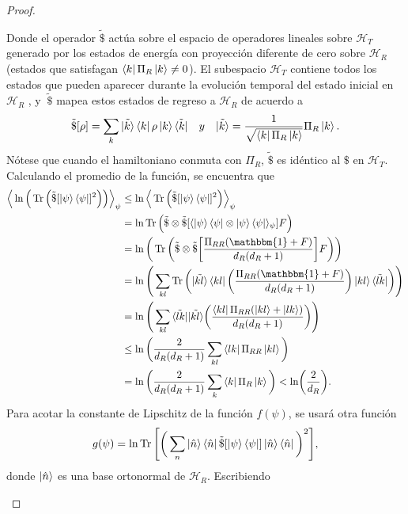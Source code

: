 \begin{proof}
\begin{enumerate}
Donde el operador  $ \tilde{\$} $ actúa sobre el espacio de operadores lineales sobre  $\mathcal{H}_{T}$ generado por los estados de energía con proyección diferente de cero sobre $\mathcal{H}_{R}$ (estados que satisfagan $\bra{k} \Pi_{R} \ket{k} \neq 0$). El subespacio $\mathcal{H}_{T}$ contiene todos los estados que pueden aparecer durante la evolución temporal del estado inicial en $\mathcal{H}_{R}$ , y $\ \widetilde{\$} $ mapea estos estados de regreso a $\mathcal{H}_{R}$ de acuerdo a 
\begin{equation}
 \tilde{\$}[\rho]= \sum_{k}  \tilde{\ket{k}} \bra{k} \rho \ket{k} \tilde{\bra{k}} \quad y \quad  \tilde{\ket{k}}= \frac{1}{\sqrt{\bra{k}\Pi_{R}\ket{k}}} \Pi_{R} \ket{k}.
\end{equation}
Nótese que cuando el hamiltoniano conmuta con $\Pi_{R}$, $ \tilde{\$}$ es idéntico al $ \$ $ en $\mathcal{H}_{T}$. Calculando el promedio de la función, se encuentra que 
\begin{align*}
\Big \langle \ln \Big( \Tr \Big( \tilde{\$}[ \ket{\psi}\bra{\psi}]^{2} \Big) \Big) \Big \rangle_{\psi} & \leq \ln \Big \langle \Tr \Big( \tilde{\$}[\ket{\psi}\bra{\psi}]^{2} \Big) \Big \rangle_{\psi}\\
&= \ln \Tr\Big( \tilde{\$}\otimes \tilde{\$} [\langle \ket{\psi}\bra{\psi} \otimes \ket{\psi}\bra{\psi} \rangle_{\psi}] F \Big)\\
&= \ln \bigg( \Tr \bigg( \tilde{\$}\otimes \tilde{\$} \bigg[ \frac{\Pi_{RR}(\mathbbm{1}+F)}{d_{R}(d_{R}+1)} \bigg] F   \bigg) \bigg)\\
&= \ln \Bigg( \sum_{kl} \Tr \bigg( \tilde{\ket{kl}} \bra{kl} \bigg( \frac{\Pi_{RR}(\mathbbm{1}+F)}{d_{R}(d_{R}+1)} \bigg) \ket{kl}  \tilde{\bra{lk}}  \bigg) \Bigg)\\
&= \ln \Bigg( \sum_{kl} \tilde{\bra{lk}}\tilde{\ket{kl}} \bigg( \frac{\bra{kl}\Pi_{RR}(\ket{kl}+\ket{lk})}{d_{R}(d_{R}+1)} \bigg) \Bigg)\\
&\leq \ln \bigg( \frac{2}{d_{R}(d_{R}+1)} \sum_{kl} \bra{lk}\Pi_{RR}\ket{kl}  \bigg)\\
&= \ln \bigg(  \frac{2}{d_{R}(d_{R}+1)} \sum_{k} \bra{k}\Pi_{R} \ket{k}  \bigg) < \ln (\frac{2}{d_{R}}).
\end{align*}
Para acotar la constante de Lipschitz  de la función $f(\psi)$, se usará otra función
\begin{equation}
g(\psi)= \ln \Tr \Bigg[  \bigg( \sum_{n} \ket{\hat{n}}\bra{\hat{n}} \tilde{\$} [\ket{\psi}\bra{\psi}] \ket{\hat{n}}\bra{\hat{n}} \bigg)^{2}  \Bigg],
\end{equation}
donde $\ket{\hat{n}}$ es una base ortonormal de $\mathcal{H}_{R}$. Escribiendo


\end{enumerate}
\end{proof}
